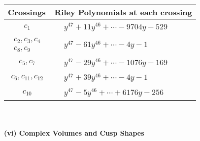 \documentclass[1p]{elsarticle_modified}
\theoremstyle{definition}
\begin{document}
\begin{tabular}{m{50pt}|m{274pt}}
Crossings & \hspace{64pt}Riley Polynomials at each crossing \\
\hline $$\begin{aligned}c_{1}\end{aligned}$$&$\begin{aligned}
&y^{47}+11 y^{46}+\cdots-9704 y-529
\end{aligned}$\\
\hline $$\begin{aligned}c_{2},c_{3},c_{4}\\c_{8},c_{9}\end{aligned}$$&$\begin{aligned}
&y^{47}-61 y^{46}+\cdots-4 y-1
\end{aligned}$\\
\hline $$\begin{aligned}c_{5},c_{7}\end{aligned}$$&$\begin{aligned}
&y^{47}-29 y^{46}+\cdots-1076 y-169
\end{aligned}$\\
\hline $$\begin{aligned}c_{6},c_{11},c_{12}\end{aligned}$$&$\begin{aligned}
&y^{47}+39 y^{46}+\cdots-4 y-1
\end{aligned}$\\
\hline $$\begin{aligned}c_{10}\end{aligned}$$&$\begin{aligned}
&y^{47}-5 y^{46}+\cdots+6176 y-256
\end{aligned}$\\
\hline
\end{tabular}\\~\\
\newpage\flushleft \textbf{(vi) Complex Volumes and Cusp Shapes}
\end{document}

